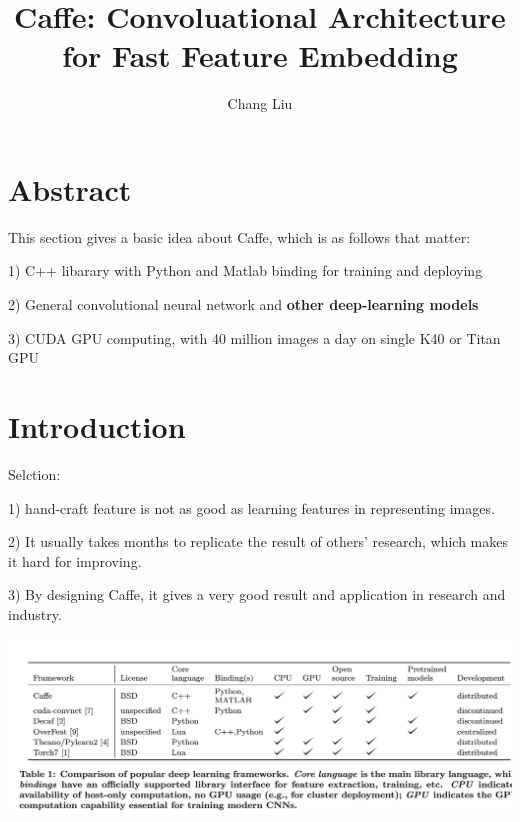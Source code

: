 \documentclass{article}
\author{Chang Liu}
\title{Caffe: Convoluational Architecture for Fast Feature Embedding}
\begin{document}

\pagestyle{main}

\maketitle

\tableofcontents
\newpage


\section{Abstract}

This section gives a basic idea about Caffe, which is as follows that matter:

1) C++ libarary with Python and Matlab binding for training and deploying

2) General convolutional neural network and \textbf{other deep-learning models}

3) CUDA GPU computing, with 40 million images a day on single K40 or Titan GPU


\section{Introduction}

Selction:

1) hand-craft feature is not as good as learning features in representing images.

2) It usually takes months to replicate the result of others' research, which makes it hard for improving.

3) By designing Caffe, it gives a very good result and application in research and industry.

\begin{center}
\includegraphics[scale=0.25]{Caffe_Note_1.png}
\end{center}
\end{document}
